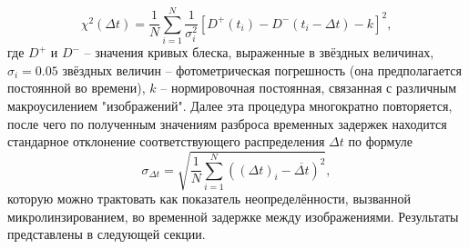 \begin{equation}\label{chi2}
\chi^{2}(\Delta t)=\frac{1}{N} \sum_{i=1}^{N} \frac{1}{\sigma_{i}^{2}}\left[D^{+}\left(t_{i}\right)-D^{-}\left(t_{i}-\Delta t\right)-k\right]^{2},
\end{equation}
где $D^+$ и $D^-$ -- значения кривых блеска, выраженные в звёздных величинах, $\sigma_i = 0.05$ звёздных величин -- фотометрическая погрешность (она предполагается постоянной во времени), $k$ -- нормировочная постоянная, связанная с различным макроусилением "изображений". Далее эта процедура многократно повторяется, после чего по полученным значениям разброса временных задержек находится стандарное отклонение соответствующего распределения $\Delta t$ по формуле
\begin{equation}\label{sigmadeltat}
\sigma_{\Delta t}=\sqrt{\frac{1}{N} \sum_{i=1}^{N}\left((\Delta t)_{i}-\overline{\Delta t}\right)^{2}},
\end{equation}
которую можно трактовать как показатель неопределённости, вызванной микролинзированием, во временной задержке между изображениями. Результаты представлены в следующей секции.
